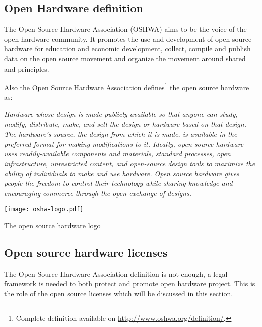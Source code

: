 \subsection{Open Hardware definition} %

The Open Source Hardware Association (OSHWA) aims to be the voice of the open hardware community. It promotes the use and development of open source hardware for education and economic development, collect, compile and publish data on the open source movement and organize the movement around shared and principles.

Also the Open Source Hardware Association defines\footnote{Complete definition available on \url{http://www.oshwa.org/definition/}.} the open source hardware as:

\begin{row}{4}{2}
    \begin{cell}{3}
        \emph{Hardware whose design is made publicly available so that anyone can study, modify, distribute, make, and sell the design or hardware based on that design. The hardware’s source, the design from which it is made, is available in the preferred format for making modifications to it. Ideally, open source hardware uses readily-available components and materials, standard processes, open infrastructure, unrestricted content, and open-source design tools to maximize the ability of individuals to make and use hardware. Open source hardware gives people the freedom to control their technology while sharing knowledge and encouraging commerce through the open exchange of designs.}
    \end{cell}
    \begin{cell}{1}
        \begin{NFfigure}
            \centering
                \texttt{[image: oshw-logo.pdf]}
            \caption{The open source hardware logo}
            \label{fig:ohw-logo}
        \end{NFfigure}
    \end{cell}
\end{row}


\subsection{Open source hardware licenses} %

The Open Source Hardware Association definition is not enough, a legal framework is needed to both protect and promote open hardware project. This is the role of the open source licenses which will be discussed in this section.

